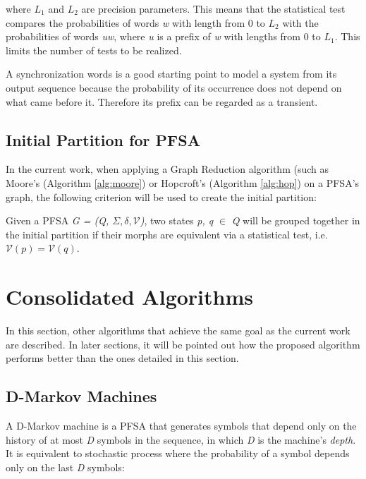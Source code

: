 {where $L_1$ and $L_2$ are precision parameters. This means that the statistical test compares the probabilities of words \textit{w} with length from 0 to \textit{$L_2$} with the probabilities of words \textit{uw}, where \textit{u} is a prefix of \textit{w} with lengths from 0 to \textit{$L_1$}. This limits the number of tests to be realized.

A synchronization words is a good starting point to model a system from its output sequence because the probability of its occurrence does not depend on what came before it. Therefore its prefix can be regarded as a transient.

\subsection{Initial Partition for PFSA}\label{subsec:inipart}

In the current work, when applying a Graph Reduction algorithm (such as Moore's (Algorithm \ref{alg:moore}) or Hopcroft's (Algorithm \ref{alg:hop}) on a PFSA's graph, the following criterion will be used to create the initial partition:

\begin{definition}\label{def:inipartpfsa}

Given a PFSA \textit{G = (Q, $\Sigma, \delta, \mathcal{V}$)}, two states \textit{p, q} $\in$ \textit{Q} will be grouped together in the initial partition if their morphs are equivalent via a statistical test, i.e. $\mathcal{V}(p) = \mathcal{V}(q)$.

\end{definition}



\section{Consolidated Algorithms}

In this section, other algorithms that achieve the same goal as the current work are described. In later sections, it will be pointed out how the proposed algorithm performs better than the ones detailed in this section.

\subsection{D-Markov Machines}

A D-Markov machine is a PFSA that generates symbols that depend only on the history of at most \textit{D} symbols in the sequence, in which \textit{D} is the machine's \textit{depth}. It is equivalent to stochastic process where the probability of a symbol depends only on the last \textit{D} symbols:

}

